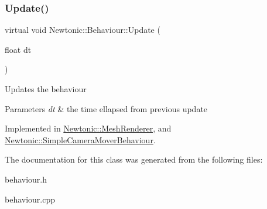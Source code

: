 \subsubsection{\texorpdfstring{Update()}{Update()}}
{\footnotesize\ttfamily virtual void Newtonic\+::\+Behaviour\+::\+Update (\begin{DoxyParamCaption}\item[{float}]{dt }\end{DoxyParamCaption})\hspace{0.3cm}{\ttfamily [pure virtual]}}

Updates the behaviour 
\begin{DoxyParams}{Parameters}
{\em dt} & the time ellapsed from previous update \\
\hline
\end{DoxyParams}


Implemented in \mbox{\hyperlink{classNewtonic_1_1MeshRenderer_aaa8628b208cc9615d9b3ad91c9d06c4e}{Newtonic\+::\+Mesh\+Renderer}}, and \mbox{\hyperlink{classNewtonic_1_1SimpleCameraMoverBehaviour_ac2c1d4f6dc0ef16361605b0a8fd37be2}{Newtonic\+::\+Simple\+Camera\+Mover\+Behaviour}}.



The documentation for this class was generated from the following files\+:\begin{DoxyCompactItemize}
\item 
behaviour.\+h\item 
behaviour.\+cpp\end{DoxyCompactItemize}
